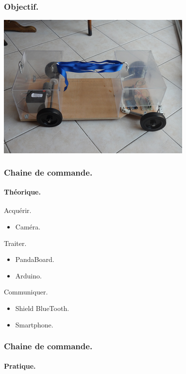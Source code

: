 \begin{frame}
    \frametitle{Objectif.}
    \begin{center}
        \includegraphics[width=0.95\linewidth]{rcs/intro.png}
    \end{center}
\end{frame}

\begin{frame}
    \frametitle{Chaine de commande.}
    \framesubtitle{Théorique.}
     {
        \begin{block}{Acquérir.}
            \begin{itemize}
                \item Caméra.
            \end{itemize}
        \end{block}
    }
     {
        \begin{block}{Traiter.}
            \begin{itemize}
                \item PandaBoard.
                \item Arduino.
            \end{itemize}
        \end{block}
    }
     {
        \begin{block}{Communiquer.}
            \begin{itemize}
                \item Shield BlueTooth.
                \item Smartphone.
            \end{itemize}
        \end{block}
    }
\end{frame}

\begin{frame}
    \frametitle{Chaine de commande.}
    \framesubtitle{Pratique.}
    
\end{frame}

